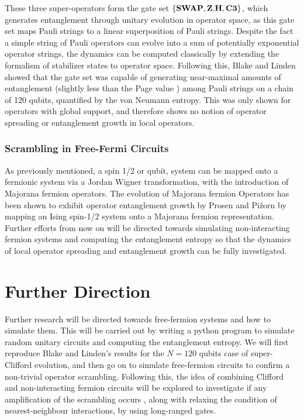 These three super-operators form the gate set $\{ {\bf SWAP}, {\bf Z.H}, {\bf C3}\}$, which generates entanglement
through unitary evolution in operator space, as this gate set maps Pauli strings to a linear superposition of Pauli strings.
Despite the fact a simple string of Pauli operators can evolve into a sum of potentially exponential operator strings,
the dynamics can be computed classically by extending the formalism of stabilizer states to operator space.
Following this, Blake and Linden showed that the gate set was capable of generating near-maximal amounts
of entanglement (slightly less than the Page value \cite{Page_1993}) among Pauli strings on a chain of 120 qubits,
quantified by the von Neumann entropy. This was only shown for operators with global support, and therefore
shows no notion of operator spreading or entanglement growth in local operators.

\subsubsection{Scrambling in Free-Fermi Circuits}
As previously mentioned, a spin 1/2 or qubit, system can be mapped onto a fermionic system via a Jordan Wigner
transformation, with the introduction of Majorana fermion operators. The evolution of Majorana fermion Operators
has been shown to exhibit operator entanglement growth by Prosen and Pi\v{z}orn \cite{Prosen_2007} by mapping an Ising spin-1/2
system onto a Majorana fermion representation. Further efforts from now on will be directed towards simulating
non-interacting fermion systems and computing the entanglement entropy so that the dynamics of local operator spreading
and entanglement growth can be fully investigated.

\section{Further Direction}
Further research will be directed towards free-fermion systems and how to simulate them. This will be carried out
by writing a python program to simulate random unitary circuits and computing the entanglement entropy. We will first
reproduce Blake and Linden's results for the $N = 120$ qubits case of super-Clifford evolution, and then go on to
simulate free-fermion circuits to confirm a non-trivial operator scrambling. Following this, the idea of combining
Clifford and non-interacting fermion circuits will be explored to investigate if any amplification of the
scrambling occurs \cite{Jozsa2008}, along with relaxing the condition of nearest-neighbour interactions, by using
long-ranged gates.



